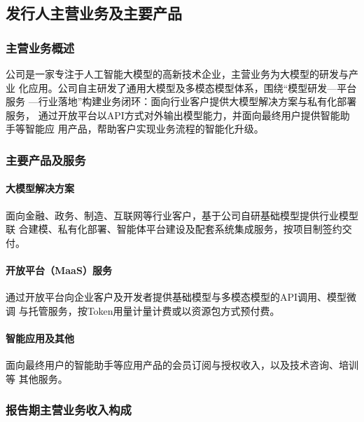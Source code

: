 
\subsection{发行人主营业务及主要产品}

\subsubsection{主营业务概述}

公司是一家专注于人工智能大模型的高新技术企业，主营业务为大模型的研发与产业
化应用。公司自主研发了通用大模型及多模态模型体系，围绕``模型研发—平台服务
—行业落地''构建业务闭环：面向行业客户提供大模型解决方案与私有化部署服务，
通过开放平台以API方式对外输出模型能力，并面向最终用户提供智能助手等智能应
用产品，帮助客户实现业务流程的智能化升级。

\subsubsection{主要产品及服务}

\paragraph{大模型解决方案}
面向金融、政务、制造、互联网等行业客户，基于公司自研基础模型提供行业模型联
合建模、私有化部署、智能体平台建设及配套系统集成服务，按项目制签约交付。

\paragraph{开放平台（MaaS）服务}
通过开放平台向企业客户及开发者提供基础模型与多模态模型的API调用、模型微调
与托管服务，按Token用量计量计费或以资源包方式预付费。

\paragraph{智能应用及其他}
面向最终用户的智能助手等应用产品的会员订阅与授权收入，以及技术咨询、培训等
其他服务。

\subsubsection{报告期主营业务收入构成}

